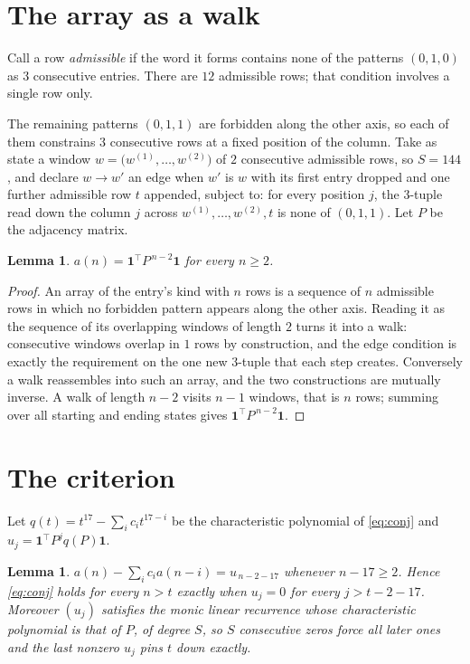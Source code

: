 \documentclass[11pt,a4paper]{article}
\theoremstyle{plain}
\newtheorem{lemma}[theorem]{Lemma}
\theoremstyle{definition}
\begin{document}
\section{The array as a walk}

Call a row \emph{admissible} if the word it forms contains none of the patterns
$(0,1,0)$ as $3$ consecutive entries. There are $12$ admissible rows; that condition
involves a single row only.

The remaining patterns $(0,1,1)$ are forbidden along the other axis, so each of them
constrains $3$ consecutive rows at a fixed position of the column. Take as state a
window $w=\bigl(w^{(1)},\dots,w^{(2)}\bigr)$ of $2$ consecutive admissible
rows, so $S=144$, and declare $w\to w'$ an edge when $w'$ is $w$ with its first entry
dropped and one further admissible row $t$ appended, subject to: for every position
$j$, the $3$-tuple read down the column $j$ across $w^{(1)},\dots,w^{(2)},t$
is none of $(0,1,1)$. Let $P$ be the adjacency matrix.

\begin{lemma}\label{lem:walk}
$a(n)=\mathbf{1}^{\!\top}P^{\,n-2}\mathbf{1}$ for every $n\ge2$.
\end{lemma}

\begin{proof}
An array of the entry's kind with $n$ rows is a sequence of $n$ admissible rows in
which no forbidden pattern appears along the other axis. Reading it as the sequence of its
overlapping windows of length $2$ turns it into a walk: consecutive windows overlap in
$1$ rows by construction, and the edge condition is exactly the requirement on the one
new $3$-tuple that each step creates. Conversely a walk reassembles into such an array,
and the two constructions are mutually inverse. A walk of length $n-2$ visits $n-1$
windows, that is $n$ rows; summing over all starting and ending states gives
$\mathbf{1}^{\!\top}P^{\,n-2}\mathbf{1}$.
\end{proof}

\section{The criterion}

Let $q(t)=t^{17}-\sum_i c_i t^{17-i}$ be the characteristic polynomial of
\eqref{eq:conj} and $u_j=\mathbf{1}^{\!\top}P^{j}q(P)\mathbf{1}$.

\begin{lemma}\label{lem:crit}
$a(n)-\sum_i c_i a(n-i)=u_{\,n-2-17}$ whenever $n-17\ge2$. Hence
\eqref{eq:conj} holds for every $n>t$ exactly when $u_j=0$ for every
$j>t-2-17$. Moreover $(u_j)$ satisfies the monic linear recurrence whose
characteristic polynomial is that of $P$, of degree $S$, so $S$ consecutive zeros force all
later ones and the last nonzero $u_j$ pins $t$ down exactly.
\end{lemma}
\end{document}
